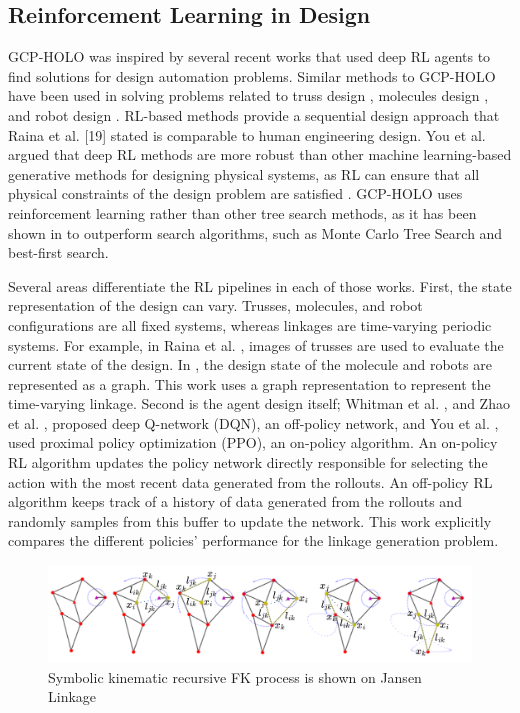\subsection{Reinforcement Learning in Design}
GCP-HOLO was inspired by several recent works that used deep RL agents to find solutions for design automation problems. Similar methods to GCP-HOLO have been used in solving problems related to truss design \cite{raina_learning_2019}, molecules design \cite{you_graph_2018}, and robot design \cite{whitman_modular_2020, zhao_robogrammar_2020}. RL-based methods provide a sequential design approach that Raina et al. [19] stated is comparable to human engineering design. You et al. argued that deep RL methods are more robust than other machine learning-based generative methods for designing physical systems, as RL can ensure that all physical constraints of the design problem are satisfied \cite{you_graph_2018}. GCP-HOLO uses reinforcement learning rather than other tree search methods, as it has been shown in \cite{you_graph_2018, whitman_modular_2020, zhao_robogrammar_2020, raina_goal-directed_2021} to outperform search algorithms, such as Monte Carlo Tree Search and best-first search.

Several areas differentiate the RL pipelines in each of those works. First, the state representation of the design can vary. Trusses, molecules, and robot configurations are all fixed systems, whereas linkages are time-varying periodic systems. For example, in Raina et al. \cite{raina_learning_2019}, images of trusses are used to evaluate the current state of the design. In  \cite{you_graph_2018, whitman_modular_2020, zhao_robogrammar_2020}, the design state of the molecule and robots are represented as a graph. This work uses a graph representation to represent the time-varying linkage. Second is the agent design itself; Whitman et al. \cite{whitman_modular_2020}, and Zhao et al. \cite{zhao_robogrammar_2020}, proposed deep Q-network (DQN), an off-policy network, and You et al. \cite{you_graph_2018}, used proximal policy optimization (PPO), an on-policy algorithm. An on-policy RL algorithm updates the policy network directly responsible for selecting the action with the most recent data generated from the rollouts. An off-policy RL algorithm keeps track of a history of data generated from the rollouts and randomly samples from this buffer to update the network. This work explicitly compares the different policies’ performance for the linkage generation problem.

\begin{figure}
    \centering
    \includegraphics[width=\linewidth]{01_figure_Symbolic Kinematics_revision.png}
    \caption{Symbolic kinematic recursive FK process is shown on Jansen Linkage}
    \label{fig:symbolic_kinemtics}
\end{figure}

